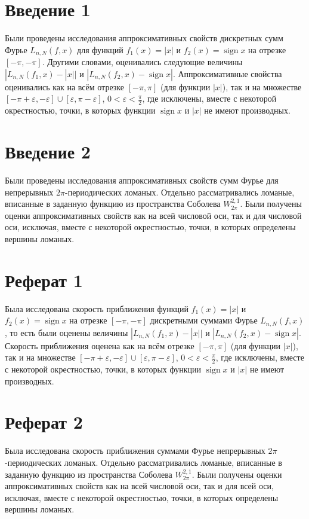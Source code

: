 \documentclass[12pt]{article}
\DeclareMathOperator*{\sign}{sign}
\begin{document}
\section{Введение 1}
Были проведены исследования аппроксимативных свойств дискретных сумм Фурье $L_{n,N}(f,x)$ для функций
$f_1(x) = |x|$ и $f_2(x) = \sign x$ на отрезке $[-\pi, -\pi]$. Другими словами, оценивались следующие величины
$|L_{n,N}(f_1,x) - |x||$
и
$|L_{n,N}(f_2,x) - \sign x|$.
Аппроксимативные свойства оценивались как на всём отрезке $[-\pi,\pi]$ (для функции $|x|$), так и на множестве $[-\pi+\varepsilon, -\varepsilon]\cup[\varepsilon,\pi-\varepsilon]$,
$0 < \varepsilon < \frac{\pi}{2}$, где исключены, вместе с некоторой окрестностью, точки, в которых функции $\sign x$ и $|x|$ не имеют производных.

\section{Введение 2}
Были проведены исследования аппроксимативных свойств сумм Фурье для непрерывных $2\pi$-периодических ломаных. Отдельно рассматривались ломаные, вписанные в заданную функцию  из пространства Соболева $W_{2\pi}^{2,1}$. Были получены оценки аппроксимативных свойств как на всей числовой оси, так и для числовой оси, исключая, вместе с некоторой окрестностью, точки, в которых определены вершины ломаных.

\section{Реферат 1}
Была исследована скорость приближения функций $f_1(x) = |x|$ и $f_2(x) = \sign x$ на отрезке $[-\pi, -\pi]$ дискретными суммами Фурье $L_{n,N}(f,x)$, то есть были оценены величины
$|L_{n,N}(f_1,x) - |x||$
и
$|L_{n,N}(f_2,x) - \sign x|$.
Скорость приближения оценена как на всём отрезке $[-\pi,\pi]$ (для функции $|x|$), так и на множестве $[-\pi+\varepsilon, -\varepsilon]\cup[\varepsilon,\pi-\varepsilon]$,
$0 < \varepsilon < \frac{\pi}{2}$, где исключены, вместе с некоторой окрестностью, точки, в которых функции $\sign x$ и $|x|$ не имеют производных.

\section{Реферат 2}
Была исследована скорость приближения суммами Фурье непрерывных $2\pi$-периодических ломаных. Отдельно рассматривались ломаные, вписанные в заданную функцию  из пространства Соболева $W_{2\pi}^{2,1}$. Были получены оценки аппроксимативных свойств как на всей числовой оси, так и для всей оси, исключая, вместе с некоторой окрестностью, точки, в которых определены вершины ломаных.
\end{document}
